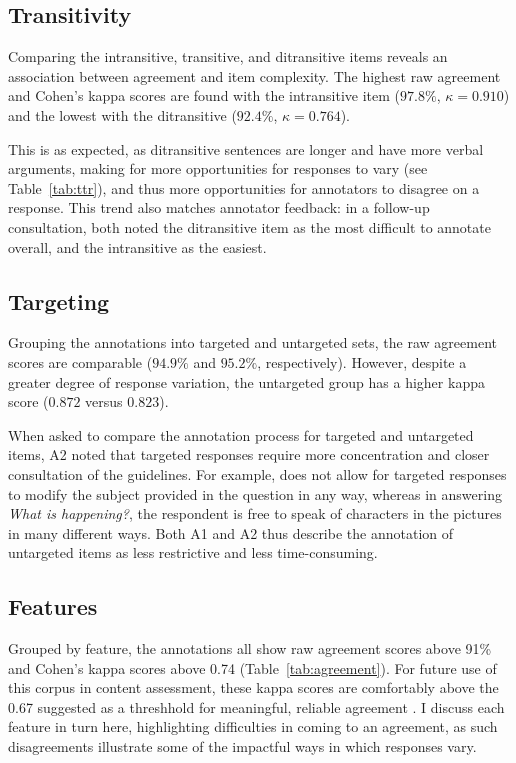 \subsection{Transitivity} 
\label{sec:transitivity}
Comparing the intransitive, transitive, and ditransitive items reveals an association between agreement and item complexity. The highest raw agreement and Cohen's kappa scores are found with the intransitive item ($97.8\%$, $\kappa=0.910$) and the lowest with the ditransitive ($92.4\%$, $\kappa=0.764$). 

This is as expected, as ditransitive sentences are longer and have more verbal arguments, making for more opportunities for responses to vary (see Table~\ref{tab:ttr}), and thus more opportunities for annotators to disagree on a response. This trend also matches annotator feedback: in a follow-up consultation, both noted the ditransitive item as the most difficult to annotate overall, and the intransitive as the easiest.

\subsection{Targeting} 
\label{sec:prompts}
Grouping the annotations into targeted and untargeted sets, the raw agreement scores are comparable ($94.9\%$ and $95.2\%$, respectively). However, despite a greater degree of response variation, the untargeted group has a higher kappa score ($0.872$ versus $0.823$).

When asked to compare the annotation process for targeted and untargeted items, A2 noted that targeted responses require more concentration and closer consultation of the guidelines. For example,  does not allow for targeted responses to modify the subject provided in the question in any way, whereas in answering \textit{What is happening?}, the respondent is free to speak of characters in the pictures in many different ways.  Both A1 and A2 thus describe the annotation of untargeted items as less restrictive and less time-consuming.

\subsection{Features} 
\label{sec:features}
Grouped by feature, the annotations all show raw agreement scores above 91\% and Cohen's kappa scores above 0.74 (Table~\ref{tab:agreement}). For future use of this corpus in content assessment, these kappa scores are comfortably above the 0.67 suggested as a threshhold for meaningful, reliable agreement \citep{landis1977measurement, artstein:massimo:2008}.  I discuss each feature in turn here, highlighting difficulties in coming to an agreement, as such disagreements illustrate some of the impactful ways in which responses vary.

